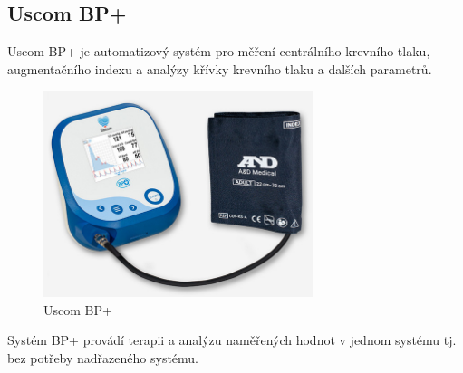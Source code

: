\subsection{Uscom BP+}
Uscom BP+ je automatizový systém pro měření centrálního krevního tlaku, augmentačního indexu a analýzy křívky krevního tlaku a dalších parametrů.
\begin{figure}[H]
    \caption{Uscom BP+}
    \includegraphics[width=0.7\textwidth]{pictures/uscom_bp.jpg}
\end{figure}
Systém BP+ provádí terapii a analýzu naměřených hodnot v jednom systému tj. bez potřeby nadřazeného systému.

